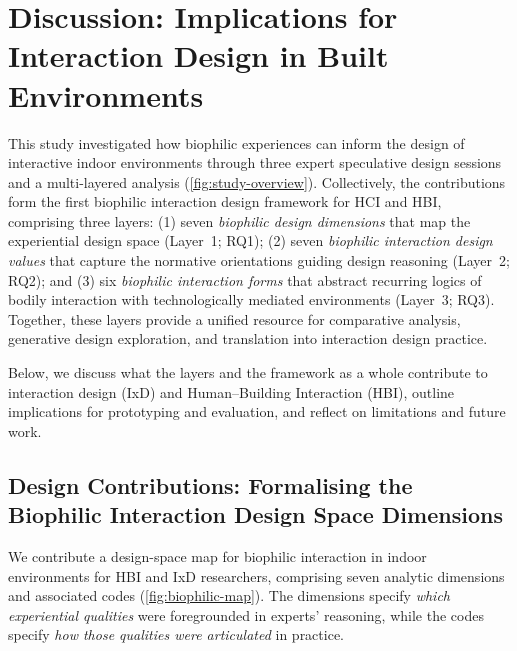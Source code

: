 \section{Discussion: Implications for Interaction Design in Built Environments}
\label{sec:ch5-discussion}

This study investigated how biophilic experiences can inform the design of interactive indoor environments through three expert speculative design sessions and a multi-layered analysis (\autoref{fig:study-overview}). Collectively, the contributions form the first biophilic interaction design framework for HCI and HBI, comprising three layers: (1) seven \emph{biophilic design dimensions} that map the experiential design space (Layer~1; RQ1); (2) seven \emph{biophilic interaction design values} that capture the normative orientations guiding design reasoning (Layer~2; RQ2); and (3) six \emph{biophilic interaction forms} that abstract recurring logics of bodily interaction with technologically mediated environments (Layer~3; RQ3). Together, these layers provide a unified resource for comparative analysis, generative design exploration, and translation into interaction design practice.

Below, we discuss what the layers and the framework as a whole contribute to interaction design (IxD) and Human--Building Interaction (HBI), outline implications for prototyping and evaluation, and reflect on limitations and future work.



\subsection{Design Contributions: Formalising the Biophilic Interaction Design Space Dimensions}
\label{subsec:ch5-layer1-discussion}
We contribute a design-space map for biophilic interaction in indoor environments for HBI and IxD researchers, comprising seven analytic dimensions and associated codes (\autoref{fig:biophilic-map}). The dimensions specify \emph{which experiential qualities} were foregrounded in experts’ reasoning, while the codes specify \emph{how those qualities were articulated} in practice. 

